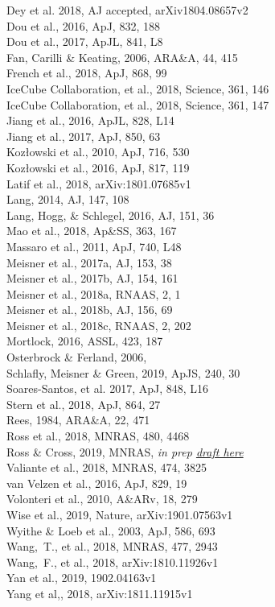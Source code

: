 \documentclass[12pt]{article}
\begin{document}
Dey et al. 2018, AJ accepted, arXiv1804.08657v2 \\
Dou et al., 2016, ApJ, 832, 188 \\ 
Dou et al., 2017, ApJL, 841, L8 \\
Fan, Carilli \& Keating, 2006, ARA\&A, 44, 415 \\
French et al., 2018, ApJ, 868, 99 \\
IceCube Collaboration, et al., 2018, Science, 361, 146 \\ 
IceCube Collaboration, et al., 2018, Science, 361, 147 \\
Jiang et al., 2016, ApJL, 828, L14 \\
Jiang et al., 2017, ApJ, 850, 63  \\
Koz{\l}owski et al., 2010, ApJ, 716, 530 \\  
Koz{\l}owski et al., 2016, ApJ, 817, 119 \\
Latif et al., 2018, arXiv:1801.07685v1 \\
Lang, 2014, AJ, 147, 108	\\
Lang, Hogg, \& Schlegel, 2016, AJ, 151, 36 \\
Mao et al., 2018,  Ap\&SS, 363, 167\\   %
Massaro et al., 2011, ApJ, 740, L48 \\ %
Meisner et al., 2017a, AJ, 153, 38 \\    
Meisner et al., 2017b, AJ, 154, 161 \\
Meisner et al., 2018a, RNAAS, 2, 1 \\
Meisner et al., 2018b, AJ, 156, 69 \\
Meisner et al., 2018c, RNAAS, 2, 202 \\
Mortlock, 2016, ASSL, 423, 187 \\
Osterbrock \& Ferland, 2006,  \\ %
Schlafly,  Meisner  \& Green, 2019, ApJS, 240, 30 \\
Soares-Santos, et al. 2017, ApJ, 848, L16	\\
Stern et al., 2018, ApJ, 864, 27 \\
Rees, 1984, ARA\&A, 22, 471 \\
Ross et al., 2018, MNRAS, 480, 4468 \\
Ross \& Cross, 2019, MNRAS, {\it in prep \href{https://github.com/d80b2t/VHzQ}{draft here}} \\
Valiante et al., 2018, MNRAS,  474, 3825 \\
van Velzen et al., 2016, ApJ, 829, 19 \\
Volonteri  et al., 2010, A\&ARv, 18, 279 \\
Wise et al., 2019, Nature,  arXiv:1901.07563v1 \\
Wyithe \& Loeb et al., 2003, ApJ, 586, 693 \\
Wang,~T., et al., 2018, MNRAS, 477, 2943 \\
Wang,~F., et al., 2018,  arXiv:1810.11926v1 \\
Yan et al., 2019, 1902.04163v1 \\
Yang et al,, 2018, arXiv:1811.11915v1 \\
\end{document}
